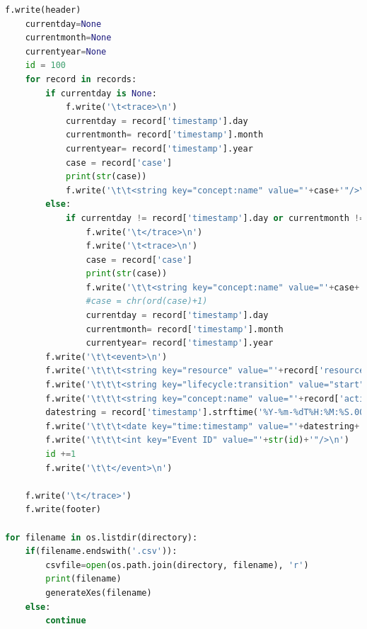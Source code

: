 \begin{lstlisting}[language=Python]
    f.write(header)
    currentday=None
    currentmonth=None
    currentyear=None
    id = 100
    for record in records:
        if currentday is None:
            f.write('\t<trace>\n')
            currentday = record['timestamp'].day
            currentmonth= record['timestamp'].month
            currentyear= record['timestamp'].year
            case = record['case']
            print(str(case))
            f.write('\t\t<string key="concept:name" value="'+case+'"/>\n')
        else:
            if currentday != record['timestamp'].day or currentmonth != record['timestamp'].month or currentyear != record['timestamp'].year:
                f.write('\t</trace>\n')
                f.write('\t<trace>\n')
                case = record['case']
                print(str(case))
                f.write('\t\t<string key="concept:name" value="'+case+'"/>\n')
                #case = chr(ord(case)+1)
                currentday = record['timestamp'].day
                currentmonth= record['timestamp'].month
                currentyear= record['timestamp'].year
        f.write('\t\t<event>\n')
        f.write('\t\t\t<string key="resource" value="'+record['resource']+'"/>\n')
        f.write('\t\t\t<string key="lifecycle:transition" value="start"/>\n')
        f.write('\t\t\t<string key="concept:name" value="'+record['activity']+'"/>\n')
        datestring = record['timestamp'].strftime('%Y-%m-%dT%H:%M:%S.000+02:00')
        f.write('\t\t\t<date key="time:timestamp" value="'+datestring+'"/>\n')
        f.write('\t\t\t<int key="Event ID" value="'+str(id)+'"/>\n')
        id +=1
        f.write('\t\t</event>\n')
    
    f.write('\t</trace>')    
    f.write(footer)

for filename in os.listdir(directory):
    if(filename.endswith('.csv')):
        csvfile=open(os.path.join(directory, filename), 'r')
        print(filename)
        generateXes(filename)
    else:
        continue

\end{lstlisting}

\clearpage
